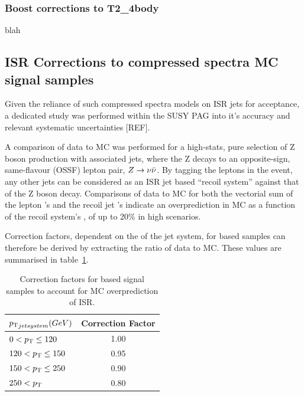 \subsubsection{Boost corrections to T2\_4body}
blah

\subsection{ISR Corrections to compressed spectra MC signal samples}
Given the reliance of such compressed spectra models on ISR jets for acceptance,
a dedicated study was performed within the SUSY PAG into it's accuracy and 
relevant systematic uncertainties [REF].

A comparison of data to MC was performed for a high-stats, pure selection of Z boson 
production with associated jets, where the Z decays to an opposite-sign,
same-flavour (OSSF) lepton pair, $Z\rightarrow \nu\bar{\nu}$. By tagging the leptons in 
the event, any other jets can be considered as an ISR jet based ``recoil system'' 
against that of the Z boson decay. Comparisons of data to MC for both the 
vectorial sum of the lepton \Ptvect's and the recoil jet \Ptvect's indicate an
overprediction in MC as a function of the recoil system's \Pt, of up to 20\% in 
high \Pt scenarios.

Correction factors, dependent on the \Pt of the jet system, for \MADGRAPH based
samples can therefore be derived by extracting the ratio of data to MC. These 
values are summarised in table~\ref{tab:isr_weights}.


\begin{table}[ht!]
  \caption{Correction factors for \MADGRAPH based signal samples to account for 
  MC overprediction of ISR.\label{tab:isr_weights}}
  \centering
  \small
  \begin{tabular}{ lc }
    \hline
    \hline
    ${p_{\text T}}_{jet system} (GeV)$    & Correction Factor \\
    \hline
    $0 <{p_{\text T}}\leq120    $          & 1.00 \\
    $120 <{p_{\text T}}\leq150  $          & 0.95 \\
    $150 <{p_{\text T}}\leq250  $          & 0.90 \\
    $250 < {p_{\text T}}        $          & 0.80 \\    
    \hline
    \hline
  \end{tabular}
\end{table}


